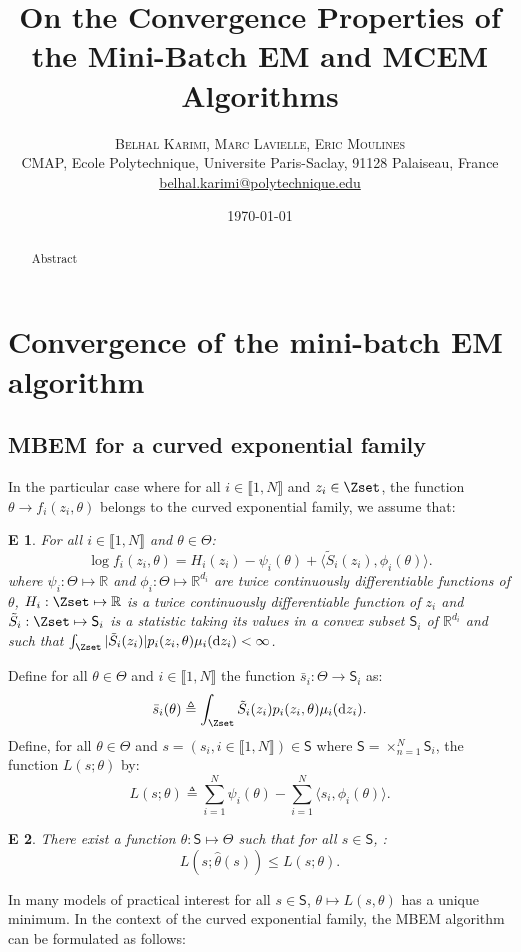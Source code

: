 \documentclass[11pt]{article}
\title{On the Convergence Properties of the Mini-Batch EM and MCEM
Algorithms}
\author{%
\textsc{Belhal Karimi, Marc Lavielle, Eric Moulines}\\
\normalsize  CMAP, Ecole Polytechnique, Universite Paris-Saclay, 91128 Palaiseau, France\\ %
\normalsize \href{mailto:belhal.karimi@polytechnique.edu}{belhal.karimi@polytechnique.edu} %
}
\date{\today} %
\theoremstyle{plain}
\newtheorem{assumption_expo}{E}
\newcommand{\inter}{\llbracket1,N\rrbracket}
\theoremstyle{plain}
\theoremstyle{definition}
\newcommand{\dz}{\mathrm{d}z}
\begin{document}
\maketitle

\begin{abstract}
Abstract
\end{abstract}


\section{Convergence of the mini-batch EM algorithm}\label{sec:mbem}

\subsection{MBEM for a curved exponential family} \label{sssec:expo}
In the particular case where for all $i \in \inter$ and $z_i \in \Zset$, the function $\theta \to f_i(z_i,\theta)$ belongs to the curved exponential family, we assume that:
\begin{assumption_expo}
For all $i \in \inter$ and $\theta \in \Theta$:
\begin{equation}
\log f_i(z_i,\theta) = H_i(z_i) -\psi_i(\theta) + \langle \tilde{S}_i(z_i), \phi_i(\theta)\rangle.
\end{equation}
where $\psi_i: \Theta \mapsto \mathbb{R}$ and $\phi_i: \Theta \mapsto \mathbb{R}^{d_i}$ are twice continuously differentiable functions of $\theta$, $H_i: \Zset \mapsto \mathbb{R}$ is a twice continuously differentiable function of $z_i$ and $\tilde{S}_i: \Zset \mapsto \mathsf{S}_i$ is a statistic taking its values in a convex subset $\mathsf{S}_i$ of $\mathbb{R}^{d_i}$ and such that $\int_{\Zset}{|\tilde{S}_i(z_i)|p_i(z_i,\theta) \mu_i(\dz_i)} < \infty$.
\end{assumption_expo}
\noindent Define for all $\theta \in \Theta$ and $i \in \inter$ the function $\bar{s}_i: \Theta \to \mathsf{S}_i$ as:
\begin{equation}
\bar{s}_i(\theta) \triangleq \int_{\Zset}{\tilde{S}_i(z_i)p_i(z_i,\theta) \mu_i(\dz_i)}.
\end{equation}
Define, for all $\theta \in \Theta$ and $s = (s_i, i \in \inter) \in \mathsf{S}$ where $\mathsf{S} = \times_{n=1}^N \mathsf{S}_i$, the function $L(s; \theta)$ by:
\begin{equation}\label{curvedL}
L(s;\theta) \triangleq \sum_{i=1}^N{\psi_i(\theta)} - \sum_{i=1}^N{\langle s_i, \phi_i(\theta)\rangle}.
\end{equation}
\begin{assumption_expo}
There exist a function $\hat{\theta}: \mathsf{S} \mapsto \Theta$ such that for all $s \in \mathsf{S}$, :
\begin{equation}\label{max_suff}
L(s;\hat{\theta}(s))\leq L(s;\theta).
\end{equation}
\end{assumption_expo}
In many models of practical interest for all $s \in \mathsf{S}$, $\theta \mapsto L(s,\theta)$ has a unique minimum. In the context of the curved exponential family, the MBEM algorithm can be formulated as follows:
\end{document}
